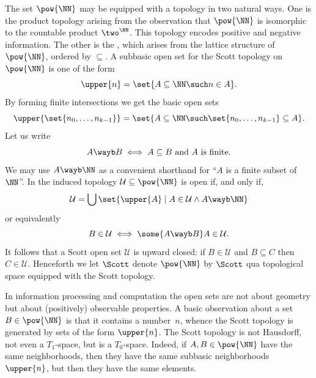 The set $\pow{\NN}$ may be equipped with a topology in two natural
ways. One is the product topology arising from the observation that
$\pow{\NN}$ is isomorphic to the countable product $\two^{\NN}$. This
topology encodes positive and negative information. The other is the
, which arises from the lattice structure of
$\pow{\NN}$, ordered by $\subseteq$. A subbasic open set for the Scott
topology on $\pow{\NN}$ is one of the form
%
\begin{equation*}
  \upper{n} = \set{A \subseteq \NN \such n \in A}.
\end{equation*}
%
By forming finite intersections we get the basic open sets
%
\begin{equation*}
  \upper{\set{n_0, \ldots, n_{k-1}}} =
  \set{A \subseteq \NN \such \set{n_0, \ldots, n_{k-1}} \subseteq A}.
\end{equation*}
%
Let us write
%
\begin{equation*}
  A \wayb B \iff
  \text{$A \subseteq B$ and $A$ is finite.}
\end{equation*}
%
We may use $A \wayb \NN$ as a convenient shorthand for ``$A$ is a finite subset of~$\NN$''.
%
In the induced topology $\mathcal{U} \subseteq \pow{\NN}$ is open if, and only if,
%
\begin{equation*}
  \mathcal{U} =
  \bigcup \set{ \upper{A} \mid A \in \mathcal{U} \land A \wayb \NN}
\end{equation*}
%
or equivalently
%
\begin{equation*}
  B \in \mathcal{U} \iff \some{A \wayb B} A \in \mathcal{U}.
\end{equation*}
%
It follows that a Scott open set $\mathcal{U}$ is upward closed: if $B \in \mathcal{U}$ and $B \subseteq C$ then $C \in \mathcal{U}$.
Henceforth we let $\Scott$ denote $\pow{\NN}$ by $\Scott$ qua topological space equipped with the Scott topology.

In information processing and computation the open sets are not about geometry but about (positively)
observable properties. A basic observation about a set $B \in \pow{\NN}$ is that it contains a number~$n$, whence the Scott topology is generated by sets of the form $\upper{n}$.
%
The Scott topology is not Hausdorff, not even a $T_1$-space, but is a $T_0$-space.
%
Indeed, if $A, B \in \pow{\NN}$ have the same neighborhoods, then they have the same subbasic neighborhoods $\upper{n}$, but then they have the same elements.


